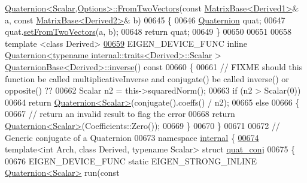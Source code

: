 \begin{DoxyCode}
{      \hyperlink{group___geometry___module_class_eigen_1_1_quaternion}{Quaternion<Scalar,Options>::FromTwoVectors}(\textcolor{keyword}{const} 
      \hyperlink{group___core___module_class_eigen_1_1_matrix_base}{MatrixBase<Derived1>}& a, \textcolor{keyword}{const} \hyperlink{group___core___module_class_eigen_1_1_matrix_base}{MatrixBase<Derived2>}& b)
00645 \{
00646     \hyperlink{group___geometry___module_class_eigen_1_1_quaternion}{Quaternion} quat;
00647     quat.\hyperlink{group___geometry___module_a61ce1b4b1faf6849c9663fd86e9b3a70}{setFromTwoVectors}(a, b);
00648     \textcolor{keywordflow}{return} quat;
00649 \}
00650 
00651 
00658 \textcolor{keyword}{template} <\textcolor{keyword}{class} Derived>
\hyperlink{group___geometry___module_a6a1d8af1fe34cb4127f705c0d10ef649}{00659} EIGEN\_DEVICE\_FUNC \textcolor{keyword}{inline} \hyperlink{group___geometry___module_class_eigen_1_1_quaternion}{Quaternion<typename internal::traits<Derived>::Scalar}
      > \hyperlink{group___geometry___module_a6a1d8af1fe34cb4127f705c0d10ef649}{QuaternionBase<Derived>::inverse}()\textcolor{keyword}{ const}
00660 \textcolor{keyword}{}\{
00661   \textcolor{comment}{// FIXME should this function be called multiplicativeInverse and conjugate() be called inverse() or
       opposite()  ??}
00662   Scalar n2 = this->squaredNorm();
00663   \textcolor{keywordflow}{if} (n2 > Scalar(0))
00664     \textcolor{keywordflow}{return} \hyperlink{group___geometry___module_class_eigen_1_1_quaternion}{Quaternion<Scalar>}(conjugate().coeffs() / n2);
00665   \textcolor{keywordflow}{else}
00666   \{
00667     \textcolor{comment}{// return an invalid result to flag the error}
00668     \textcolor{keywordflow}{return} \hyperlink{group___geometry___module_class_eigen_1_1_quaternion}{Quaternion<Scalar>}(Coefficients::Zero());
00669   \}
00670 \}
00671 
00672 \textcolor{comment}{// Generic conjugate of a Quaternion}
00673 \textcolor{keyword}{namespace }\hyperlink{namespaceinternal}{internal} \{
\hyperlink{struct_eigen_1_1internal_1_1quat__conj}{00674} \textcolor{keyword}{template}<\textcolor{keywordtype}{int} Arch, \textcolor{keyword}{class} Derived, \textcolor{keyword}{typename} Scalar> \textcolor{keyword}{struct }\hyperlink{struct_eigen_1_1internal_1_1quat__conj}{quat\_conj}
00675 \{
00676   EIGEN\_DEVICE\_FUNC \textcolor{keyword}{static} EIGEN\_STRONG\_INLINE \hyperlink{group___geometry___module_class_eigen_1_1_quaternion}{Quaternion<Scalar>} run(\textcolor{keyword}{const} 
}
\end{DoxyCode}
